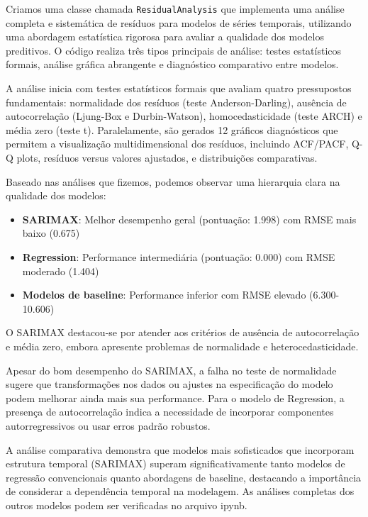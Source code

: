 \documentclass{article}
\begin{document}
Criamos uma classe chamada \texttt{ResidualAnalysis} que implementa uma análise completa e sistemática de resíduos para modelos de séries temporais, utilizando uma abordagem estatística rigorosa para avaliar a qualidade dos modelos preditivos. O código realiza três tipos principais de análise: testes estatísticos formais, análise gráfica abrangente e diagnóstico comparativo entre modelos.

A análise inicia com testes estatísticos formais que avaliam quatro pressupostos fundamentais: normalidade dos resíduos (teste Anderson-Darling), ausência de autocorrelação (Ljung-Box e Durbin-Watson), homocedasticidade (teste ARCH) e média zero (teste t). Paralelamente, são gerados 12 gráficos diagnósticos que permitem a visualização multidimensional dos resíduos, incluindo ACF/PACF, Q-Q plots, resíduos versus valores ajustados, e distribuições comparativas.

Baseado nas análises que fizemos, podemos observar uma hierarquia clara na qualidade dos modelos:

\begin{itemize}
    \item \textbf{SARIMAX}: Melhor desempenho geral (pontuação: 1.998) com RMSE mais baixo (0.675)
    \item \textbf{Regression}: Performance intermediária (pontuação: 0.000) com RMSE moderado (1.404)
    \item \textbf{Modelos de baseline}: Performance inferior com RMSE elevado (6.300-10.606)
\end{itemize}

O SARIMAX destacou-se por atender aos critérios de ausência de autocorrelação e média zero, embora apresente problemas de normalidade e heterocedasticidade. 

Apesar do bom desempenho do SARIMAX, a falha no teste de normalidade sugere que transformações nos dados ou ajustes na especificação do modelo podem melhorar ainda mais sua performance. Para o modelo de Regression, a presença de autocorrelação indica a necessidade de incorporar componentes autorregressivos ou usar erros padrão robustos.

A análise comparativa demonstra que modelos mais sofisticados que incorporam estrutura temporal (SARIMAX) superam significativamente tanto modelos de regressão convencionais quanto abordagens de baseline, destacando a importância de considerar a dependência temporal na modelagem. As análises completas dos outros modelos podem ser verificadas no arquivo ipynb.
\end{document}
